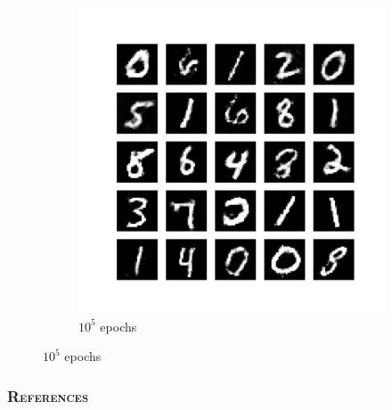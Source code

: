 \documentclass{beamer}
\begin{document}
\begin{frame}
\begin{figure}[H]
\begin{center}
\begin{subfigure}{0.45\textwidth}
					\includegraphics[scale = 0.24, trim = {3cm 3cm 3cm 3cm},clip]{regenerated_mnist_data_100000.pdf}
					\caption{$10^{5}$ epochs} 
				\end{subfigure}
			\end{center}
		\end{figure}
	\end{frame}
	
	\begin{frame}%
		\frametitle{\textsc{References}}
		\nocite{*} 
		
		
	\end{frame}

\end{document}
